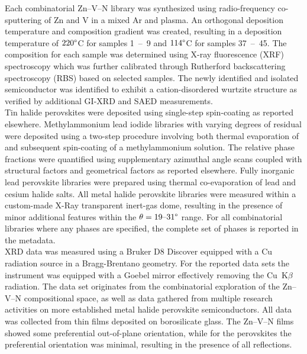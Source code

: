 Each combinatorial Zn–V–N library was synthesized using radio-frequency co-sputtering of Zn and V in a mixed Ar and  plasma. An orthogonal deposition temperature and composition gradient was created, resulting in a deposition temperature of $220\degree$C for samples 1~–~9 and $114\degree$C for samples 37~–~45. The composition for each sample was determined using X-ray fluorescence (XRF) spectroscopy which was further calibrated through Rutherford backscattering spectroscopy (RBS) based on selected samples. The newly identified and isolated semiconductor  was identified to exhibit a cation-disordered wurtzite structure as verified by additional GI-XRD and SAED measurements\cite{Zhuk2021}. \\
Tin halide perovskites were deposited using single-step spin-coating as reported elsewhere\cite{Wieczorek2023}. Methylammonium lead iodide libraries with varying degrees of residual  were deposited using a two-step procedure involving both thermal evaporation of  and subsequent spin-coating of a methylammonium solution. The relative phase fractions were quantified using supplementary azimuthal angle scans coupled with structural factors and geometrical factors as reported elsewhere\cite{Wieczorek2024}. Fully inorganic lead perovskite libraries were prepared using thermal co-evaporation of lead and cesium halide salts.
All metal halide perovskite libraries were measured within a custom-made X-Ray transparent inert-gas dome, resulting in the presence of minor additional features within the $\theta=19 \text{–}31\degree$ range. For all combinatorial libraries where any phases are specified, the complete set of phases is reported in the metadata. \\

XRD data was measured using a Bruker D8 Discover equipped with a Cu radiation source in a Bragg-Brentano geometry. For the reported data sets the instrument was equipped with a Goebel mirror effectively removing the Cu~K$\beta$ radiation. The data set originates from the combinatorial exploration of the Zn–V–N compositional space, as well as data gathered from multiple research activities on more established metal halide perovskite semiconductors. All data was collected from thin films deposited on borosilicate glass. The Zn–V–N films showed some preferential out-of-plane orientation, while for the perovskites the preferential orientation was minimal, resulting in the presence of all reflections. \\

